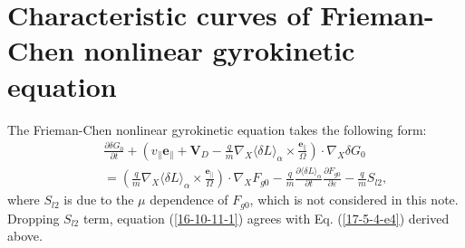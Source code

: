 \documentclass{article}
\begin{document}
\section{Characteristic curves of Frieman-Chen nonlinear gyrokinetic equation}

The Frieman-Chen nonlinear gyrokinetic equation takes the following form:
\begin{eqnarray}
  &  & \frac{\partial \delta G_0}{\partial t} + \left( v_{\parallel}
  \mathbf{e}_{\parallel} +\mathbf{V}_D - \frac{q}{m} \nabla_X \langle \delta L
  \rangle_{\alpha} \times \frac{\mathbf{e}_{\parallel}}{\Omega} \right) \cdot
  \nabla_X \delta G_0 \nonumber\\
  &  & = \left( \frac{q}{m} \nabla_X \langle \delta L \rangle_{\alpha} \times
  \frac{\mathbf{e}_{\parallel}}{\Omega} \right) \cdot \nabla_X F_{g 0} -
  \frac{q}{m} \frac{\partial \langle \delta L \rangle_{\alpha}}{\partial t}
  \frac{\partial F_{g 0}}{\partial \varepsilon} - \frac{q}{m} S_{l 2}, 
  \label{16-10-11-1}
\end{eqnarray}
where $S_{l 2}$ is due to the $\mu$ dependence of $F_{g 0}$, which is not
considered in this note. Dropping $S_{l 2}$ term, equation (\ref{16-10-11-1})
agrees with Eq. (\ref{17-5-4-e4}) derived above.
\end{document}
